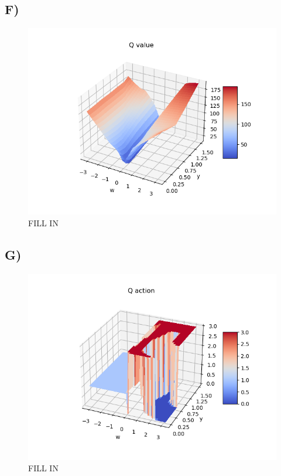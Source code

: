 \documentclass{article}
\begin{document}
\subsection*{F)}
\begin{figure}[H]
    \centering
    \includegraphics[width=1\textwidth]{Lab_2/problem1/images/Q_value.png}
    \caption{\small FILL IN}
    \label{fig:Q_value}
\end{figure}

\subsection*{G)}
\begin{figure}[H]
    \centering
    \includegraphics[width=1\textwidth]{Lab_2/problem1/images/Q_action.png}
    \caption{\small FILL IN }
    \label{fig:Q_action}
\end{figure}
\end{document}
